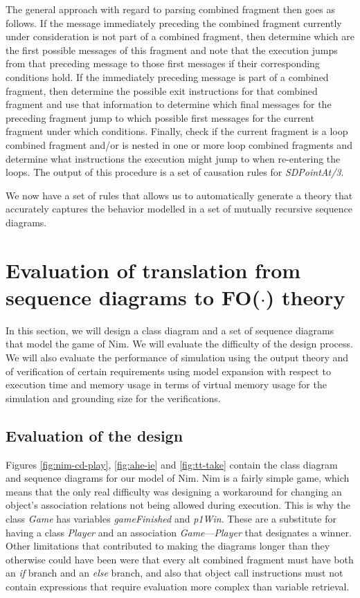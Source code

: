 \documentclass[conference]{IEEEtran}
\begin{document}
The general approach with regard to parsing combined fragment then goes as follows. If the message immediately preceding the combined fragment currently under consideration is not part of a combined fragment, then determine which are the first possible messages of this fragment and note that the execution jumps from that preceding message to those first messages if their corresponding conditions hold. If the immediately preceding message is part of a combined fragment, then determine the possible exit instructions for that combined fragment and use that information to determine which final messages for the preceding fragment jump to which possible first messages for the current fragment under which conditions. Finally, check if the current fragment is a loop combined fragment and/or is nested in one or more loop combined fragments and determine what instructions the execution might jump to when re-entering the loops. The output of this procedure is a set of causation rules for \textit{SDPointAt/3}.

We now have a set of rules that allows us to automatically generate a theory that accurately captures the behavior modelled in a set of mutually recursive sequence diagrams.

\section{Evaluation of translation from sequence diagrams to FO($\cdot$) theory}\label{sec:evaluation}

In this section, we will design a class diagram and a set of sequence diagrams that model the game of Nim. We will evaluate the difficulty of the design process. We will also evaluate the performance of simulation using the output theory and of verification of certain requirements using model expansion with respect to execution time and memory usage in terms of virtual memory usage for the simulation and grounding size for the verifications.

\subsection{Evaluation of the design}
Figures \ref{fig:nim-cd-play}, \ref{fig:ahe-ie} and \ref{fig:tt-take} contain the class diagram and sequence diagrams for our model of Nim. Nim is a fairly simple game, which means that the only real difficulty was designing a workaround for changing an object's association relations not being allowed during execution. This is why the class \textit{Game} has variables \textit{gameFinished} and \textit{p1Win}. These are a substitute for having a class \textit{Player} and an association \textit{Game}---\textit{Player} that designates a winner. Other limitations that contributed to making the diagrams longer than they otherwise could have been were that every alt combined fragment must have both an \textit{if} branch and an \textit{else} branch, and also that object call instructions must not contain expressions that require evaluation more complex than variable retrieval.
\end{document}
